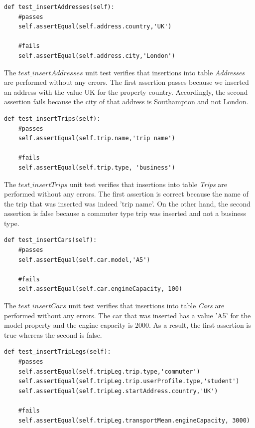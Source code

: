 \begin{verbatim}
def test_insertAddresses(self):
    #passes
    self.assertEqual(self.address.country,'UK')

    #fails
    self.assertEqual(self.address.city,'London')
\end{verbatim}

The $test\_insertAddresses$ unit test verifies that insertions into table \emph{Addresses} are performed without any errors. The first assertion passes because we inserted an address with the value UK for the property country. Accordingly, the second assertion fails because the city of that address is Southampton and not London.


\begin{verbatim}
def test_insertTrips(self):
    #passes
    self.assertEqual(self.trip.name,'trip name')

    #fails
    self.assertEqual(self.trip.type, 'business')
\end{verbatim}

The $test\_insertTrips$ unit test verifies that insertions into table \emph{Trips} are performed without any errors. The first assertion is correct because the name of the trip that was inserted was indeed 'trip name'. On the other hand, the second assertion is false because a commuter type trip was inserted and not a business type.

\begin{verbatim}
def test_insertCars(self):
    #passes
    self.assertEqual(self.car.model,'A5')

    #fails
    self.assertEqual(self.car.engineCapacity, 100)
\end{verbatim}

The $test\_insertCars$ unit test verifies that insertions into table \emph{Cars} are performed without any errors. The car that was inserted has a value 'A5' for the model property and the engine capacity is 2000. As a result, the first assertion is true whereas the second is false.

\begin{verbatim}
def test_insertTripLegs(self):
    #passes
    self.assertEqual(self.tripLeg.trip.type,'commuter')
    self.assertEqual(self.tripLeg.trip.userProfile.type,'student')
    self.assertEqual(self.tripLeg.startAddress.country,'UK')

    #fails
    self.assertEqual(self.tripLeg.transportMean.engineCapacity, 3000)
\end{verbatim}

